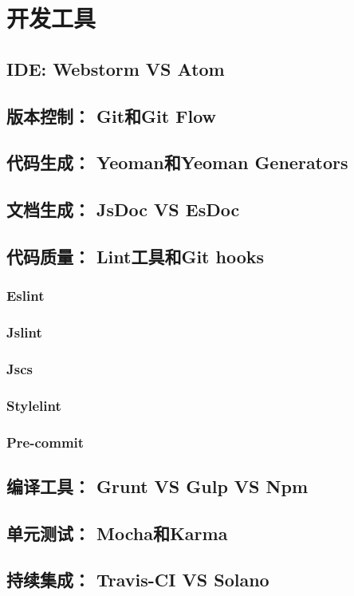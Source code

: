 \section{开发工具}
\subsection{IDE: Webstorm VS Atom}
\subsection{版本控制： Git和Git Flow}
\subsection{代码生成： Yeoman和Yeoman Generators}
\subsection{文档生成： JsDoc VS EsDoc}
\subsection{代码质量： Lint工具和Git hooks}
\subsubsection{Eslint}
\subsubsection{Jslint}
\subsubsection{Jscs}
\subsubsection{Stylelint}
\subsubsection{Pre-commit}
\subsection{编译工具： Grunt VS Gulp VS Npm}
\subsection{单元测试： Mocha和Karma}
\subsection{持续集成： Travis-CI VS Solano}



